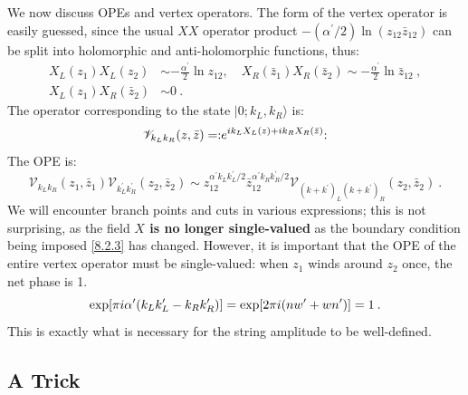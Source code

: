 We now discuss OPEs and vertex operators. The form of the vertex operator is easily guessed, since the usual $XX$ operator product $-(\alpha^{\prime} / 2) \ln (z_{12} \bar{z}_{12})$ can be split into holomorphic and anti-holomorphic functions, thus:
\begin{subequations} \label{8.2.17}
	\begin{align}
		X_{L}(z_{1}) X_{L}(z_{2}) &\sim-\frac{\alpha^{\prime}}{2} \ln z_{12}, \quad 
		X_{R}(\bar{z}_{1}) X_{R}(\bar{z}_{2}) \sim-\frac{\alpha^{\prime}}{2} \ln \bar{z}_{12}  \:,  \label{8.2.17a} \\
		X_{L}(z_{1}) X_{R}(\bar{z}_{2}) &\sim 0 \:. \label{8.2.17b}
	\end{align}		
\end{subequations}
The operator corresponding to the state $|0 ; k_{L}, k_{R}\rangle$ is:
\begin{equation}
	\mathscr{V}_{k_{L} k_{R}}(z, \bar{z}) = : \mathrel{e^{i k_{L} X_{L}(z)+ i k_{R} X_{R}(\bar{z})}}: \label{8.2.18}
\end{equation}
The OPE is:
\begin{equation}
	\mathscr{V}_{k_{L} k_{R}}(z_{1}, \bar{z}_{1}) \mathscr{V}_{k_{L}^{\prime} k_{R}^{\prime}}(z_{2}, \bar{z}_{2}) \sim 
	z_{12}^{\alpha^{\prime} k_{L} k_{L}^{\prime} / 2} \bar{z}_{12}^{\alpha^{\prime} k_{R} k_{R}^{\prime} / 2} 
	\mathscr{V}_{(k+k^{\prime})_{L}(k+k^{\prime})_{R}}(z_{2}, \bar{z}_{2}) \:. \label{8.2.19}
\end{equation}
We will encounter branch points and cuts in various expressions; this is not surprising, as the field \textbf{$X$ is no longer single-valued} as the boundary condition being imposed \eqref{8.2.3} has changed. However, it is important that the OPE of the entire vertex operator must be single-valued: when $z_{1}$ winds around $z_{2}$ once, the net phase is 1.
\begin{equation}
	\exp [\pi i \alpha^{\prime}(k_{L} k_{L}^{\prime}-k_{R} k_{R}^{\prime})]
	=\exp [2 \pi i(n w^{\prime}+w n^{\prime})]=1 \:. \label{8.2.20}
\end{equation}
This is exactly what is necessary for the string amplitude to be well-defined.

\subsection*{A Trick}

